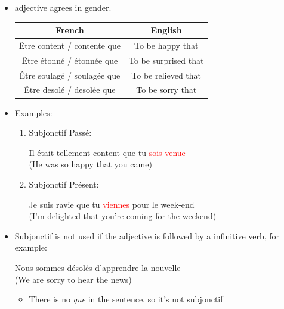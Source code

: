 \documentclass{book}
\begin{document}
\begin{itemize}
\begin{itemize}
                    \item adjective agrees in gender.
                    \begin{center}
                        \begin{tabular}{|c|c|}
                            \hline
                            \textbf{French} & \textbf{English} \\
                            \hline
                            Être content / contente que & To be happy that \\
                            \hline
                            Être étonné / étonnée que & To be surprised that \\
                            \hline
                            Être soulagé / soulagée que & To be relieved that \\
                            \hline
                            Être desolé / desolée que & To be sorry that \\
                            \hline
                        \end{tabular}
                    \end{center}

                    \item Examples:
                    \begin{enumerate}
                        \item Subjonctif Passé:
                        \begin{center}
                            Il était tellement content que tu \textcolor{red}{sois venue} \\
                            (He was so happy that you came) 
                        \end{center}

                        \item Subjonctif Présent:
                        \begin{center}
                            Je suis ravie que tu \textcolor{red}{viennes} pour le week-end \\
                            (I'm delighted that you're coming for the weekend)
                        \end{center}
                    \end{enumerate}

                    \item Subjonctif is not used if the adjective is followed by a infinitive verb, for example:
                    \begin{center}
                        Nous sommes désolés d'apprendre la nouvelle \\
                        (We are sorry to hear the news)
                    \end{center}
                    \begin{itemize}
                        \item There is no \textit{que} in the sentence, so it's not subjonctif
                    \end{itemize}
                \end{itemize}


\end{itemize}
\end{document}
